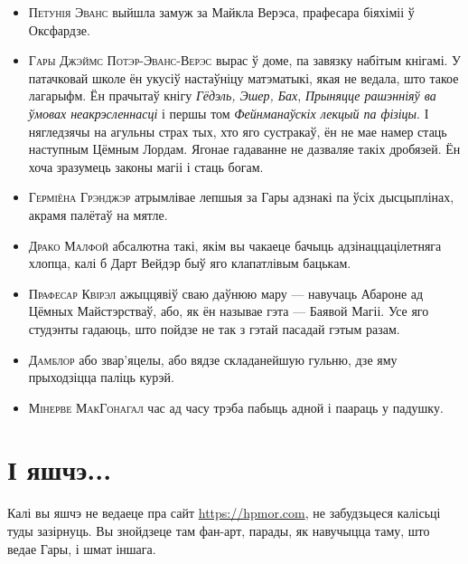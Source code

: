 \begin{itemize}
\item \textsc{Петунія Эванс} 
выйшла замуж за Майкла Верэса, прафесара біяхіміі ў Оксфардзе.
\item \textsc{Гары Джэймс Потэр-Эванс-Верэс}
вырас ў доме, па завязку набітым кнігамі. У патачковай школе ён укусіў настаўніцу матэматыкі,
якая не ведала, што такое лагарыфм. Ён прачытаў кнігу \emph{Гёдэль, Эшер, Бах},
\emph{Прыняцце рашэнніяў ва ўмовах неакрэсленнасці} і першы том 
\emph{Фейнманаўскіх лекцый па фізіцы}. І нягледзячы на агульны страх тых, хто 
яго сустракаў, ён не мае намер стаць наступным Цёмным Лордам. 
Ягонае гадаванне не дазваляе такіх дробязей. Ён хоча зразумець законы магіі і стаць
богам. 
\item \textsc{Герміёна Грэнджэр} атрымлівае лепшыя за Гары адзнакі па ўсіх дысцыплінах,
акрамя палётаў на мятле.
\item \textsc{Драко Малфой} абсалютна такі, якім вы чакаеце бачыць адзінаццацілетняга
хлопца, калі б Дарт Вейдэр быў яго клапатлівым бацькам. 
\item \textsc{Прафесар Квірэл} ажыццявіў сваю даўнюю мару --- навучаць 
Абароне ад Цёмных Майстэрстваў, або, як ён называе гэта --- Баявой Магіі. 
Усе яго студэнты гадаюць, што пойдзе не так з гэтай пасадай гэтым разам.
\item \textsc{Дамблор} або звар'яцелы, або вядзе складанейшую гульню, дзе
яму прыходзіцца паліць курэй. 
\item \textsc{Мінерве МакГонагал} час ад часу трэба пабыць адной і паараць у падушку.
\end{itemize}

%
%

\section*{І яшчэ...}
 
Калі вы яшчэ не ведаеце пра сайт \url{https://hpmor.com}, не забудзьцеся 
калісьці туды зазірнуць. Вы знойдзеце там фан-арт, парады, як навучыцца таму, што
ведае Гары, і шмат іншага.



